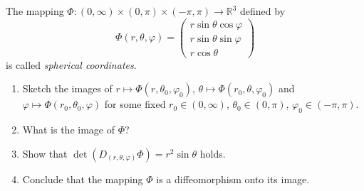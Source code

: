 \begin{exercise}
\label{ex:7.6}
The mapping $\Phi : (0,\infty)\times(0,\pi)\times(-\pi,\pi) \to \mathbb{R}^3$ defined by
\[\Phi(r,\theta,\varphi) = \begin{pmatrix} r\sin\theta\cos\varphi \\ r\sin\theta\sin\varphi \\ r\cos\theta \end{pmatrix}\]
is called \textit{spherical coordinates}.
\begin{enumerate}[label=\textbf{\arabic*.}]
  \item Sketch the images of $r \mapsto \Phi(r,\theta_0,\varphi_0)$, $\theta \mapsto
    \Phi(r_0,\theta,\varphi_0)$ and $\varphi \mapsto \Phi(r_0,\theta_0,\varphi)$ for some fixed
    $r_0 \in (0,\infty)$, $\theta_0 \in (0,\pi)$, $\varphi_0 \in (-\pi,\pi)$.
  \item What is the image of $\Phi$?
  \item Show that $\det(D_{(r,\theta,\varphi)}\Phi) = r^2\sin\theta$ holds.
  \item Conclude that the mapping $\Phi$ is a diffeomorphism onto its image.
\end{enumerate}
\end{exercise}
